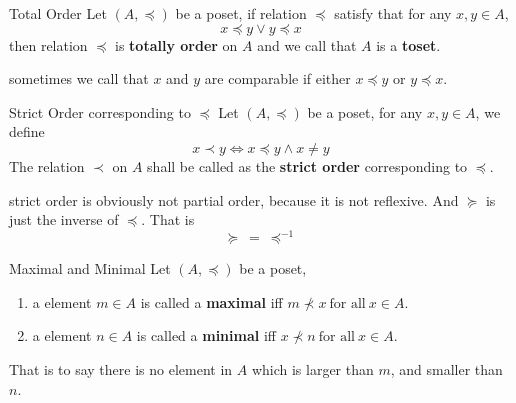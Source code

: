 \newpage

\begin{definition}{Total Order}{}
    Let $(A,\preceq)$ be a poset, if relation $\preceq$ satisfy that
    for any $x,y \in A$,
    \begin{equation*}
        x \preceq y \lor y \preceq x
    \end{equation*}
    then relation $\preceq$ is \textbf{totally order} on $A$ and we
    call that $A$ is a \textbf{toset}.
\end{definition}

\begin{remarks}
    sometimes we call that $x$ and $y$ are comparable if either $x
    \preceq y$ or $y \preceq x$.
\end{remarks}
\begin{definition}{Strict Order corresponding to $\preceq$}{}
    Let $(A,\preceq)$ be a poset, for any $x,y \in A$, we define
    \begin{equation*}
        x \prec y \iff  x \preceq y \land x \neq y
    \end{equation*}
    The relation $\prec$ on $A$ shall be called as the \textbf{strict
    order} corresponding to $\preceq$.
\end{definition}

\begin{remarks}
    strict order is obviously not partial order, because it is not
    reflexive. And $\succeq$ is just the inverse of $\preceq$. That is
    \begin{equation*}
        \succeq \ = \ \preceq^{-1}
    \end{equation*}
\end{remarks}

\begin{definition}{Maximal and Minimal}{}
    Let $(A,\preceq)$ be a poset,
    \begin{enumerate}

        \item a element $m \in A$ is called a \textbf{maximal} iff $m
            \nprec x \ \text{for all}\ x \in A$.
        \item a element $n \in A$ is called a \textbf{minimal} iff $x
            \nprec n \ \text{for all}\ x \in A$.

    \end{enumerate}

    That is to say there is no element in $A$ which is larger than $m$,
    and smaller than $n$.
\end{definition}

